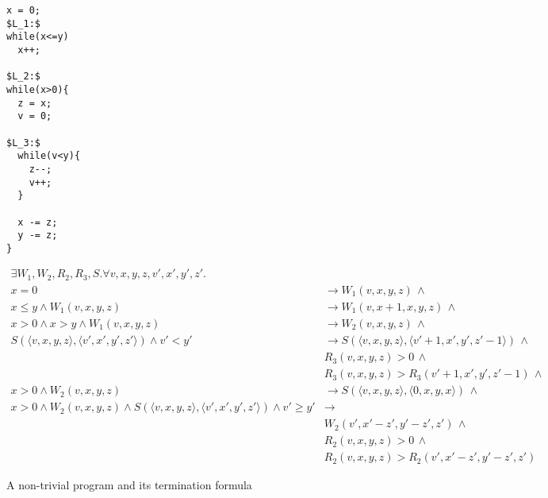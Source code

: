 \documentclass[preprint]{sigplanconf}
\theoremstyle{definition}
\begin{document}
\begin{figure*}
\begin{framed}
\begin{minipage}{0.145\textwidth}
\begin{lstlisting}[mathescape=true]
x = 0;
$L_1:$
while(x<=y)
  x++;

$L_2:$
while(x>0){
  z = x;
  v = 0;

$L_3:$
  while(v<y){
    z--;
    v++;
  }

  x -= z;
  y -= z;
}
\end{lstlisting}
\end{minipage}
\vline
\begin{minipage}{0.85\textwidth}
\begin{align*}
 \exists W_1, W_2, R_2, R_3, S . \forall v, x, y, z, v', x', y', z' . \\
   x = 0 & \rightarrow W_1(v, x, y, z) \, \wedge \\
   x \leq y \wedge W_1(v, x, y, z) & \rightarrow W_1(v, x+1, x, y, z) \, \wedge \\
   x > 0 \wedge x > y \wedge W_1(v, x, y, z) & \rightarrow W_2(v, x, y, z) \, \wedge \\
   S(\langle v, x, y, z \rangle, \langle v', x', y', z' \rangle) \wedge v' < y' & \rightarrow S(\langle v, x, y, z \rangle, \langle v'+1, x', y', z'-1 \rangle) \, \wedge \\
   & R_3(v,x,y,z) > 0 \, \wedge \\
   & R_3(v,x,y,z) > R_3(v'+1,x',y',z'-1) \, \wedge\\
   x > 0 \wedge W_2(v, x, y, z) & \rightarrow S(\langle v, x, y, z \rangle, \langle 0, x, y, x \rangle) \, \wedge \\
   x > 0 \wedge W_2(v, x, y, z) \wedge S(\langle v, x, y, z \rangle, \langle v', x', y', z' \rangle) \wedge v' \geq y' & \rightarrow \\
   & W_2(v', x' - z', y' - z', z') \, \wedge \\
   & R_2(v, x, y, z) > 0 \, \wedge \\
   & R_2(v, x, y, z) > R_2(v', x' - z', y'-z', z')
\end{align*}
\end{minipage}
\end{framed}
\caption{A non-trivial program and its termination formula\label{fig:environment-model}}
\end{figure*}
\end{document}
